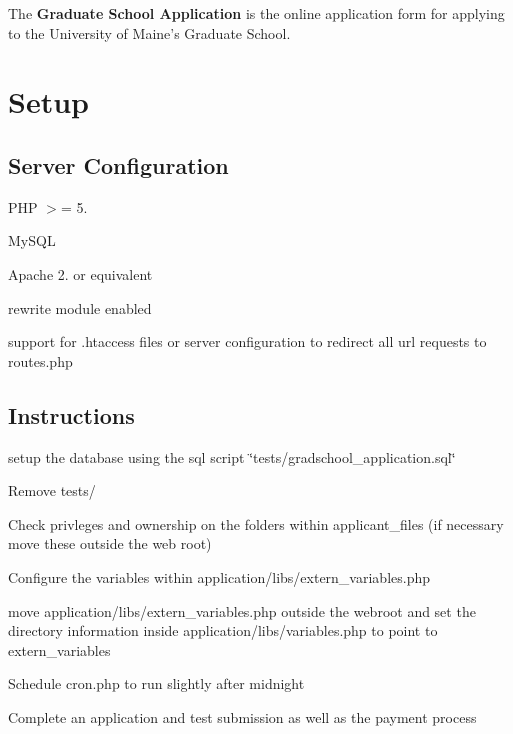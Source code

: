 The {\bfseries Graduate School Application} is the online application form for applying to the University of Maine's Graduate School.

\section*{Setup}

\subsection*{Server Configuration}


\begin{DoxyItemize}
\item P\-H\-P $>$= 5.
\item My\-S\-Q\-L
\item Apache 2. or equivalent
\begin{DoxyItemize}
\item rewrite module enabled
\item support for .htaccess files or server configuration to redirect all url requests to routes.\-php
\end{DoxyItemize}
\end{DoxyItemize}

\subsection*{Instructions}


\begin{DoxyEnumerate}
\item setup the database using the sql script \char`\"{}tests/gradschool\-\_\-application.\-sql\char`\"{}
\item Remove tests/
\item Check privleges and ownership on the folders within applicant\-\_\-files (if necessary move these outside the web root)
\item Configure the variables within application/libs/extern\-\_\-variables.\-php
\item move application/libs/extern\-\_\-variables.\-php outside the webroot and set the directory information inside application/libs/variables.\-php to point to extern\-\_\-variables
\item Schedule cron.\-php to run slightly after midnight
\item Complete an application and test submission as well as the payment process
\end{DoxyEnumerate}


